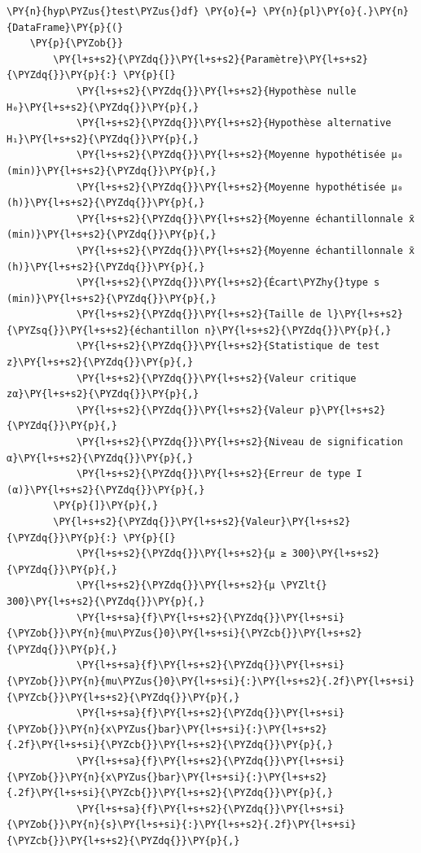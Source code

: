 \begin{tcolorbox}[breakable, size=fbox, boxrule=1pt, pad at break*=1mm,colback=cellbackground, colframe=cellborder]
\begin{Verbatim}[commandchars=\\\{\}]
\PY{n}{hyp\PYZus{}test\PYZus{}df} \PY{o}{=} \PY{n}{pl}\PY{o}{.}\PY{n}{DataFrame}\PY{p}{(}
    \PY{p}{\PYZob{}}
        \PY{l+s+s2}{\PYZdq{}}\PY{l+s+s2}{Paramètre}\PY{l+s+s2}{\PYZdq{}}\PY{p}{:} \PY{p}{[}
            \PY{l+s+s2}{\PYZdq{}}\PY{l+s+s2}{Hypothèse nulle H₀}\PY{l+s+s2}{\PYZdq{}}\PY{p}{,}
            \PY{l+s+s2}{\PYZdq{}}\PY{l+s+s2}{Hypothèse alternative H₁}\PY{l+s+s2}{\PYZdq{}}\PY{p}{,}
            \PY{l+s+s2}{\PYZdq{}}\PY{l+s+s2}{Moyenne hypothétisée μ₀ (min)}\PY{l+s+s2}{\PYZdq{}}\PY{p}{,}
            \PY{l+s+s2}{\PYZdq{}}\PY{l+s+s2}{Moyenne hypothétisée μ₀ (h)}\PY{l+s+s2}{\PYZdq{}}\PY{p}{,}
            \PY{l+s+s2}{\PYZdq{}}\PY{l+s+s2}{Moyenne échantillonnale x̄ (min)}\PY{l+s+s2}{\PYZdq{}}\PY{p}{,}
            \PY{l+s+s2}{\PYZdq{}}\PY{l+s+s2}{Moyenne échantillonnale x̄ (h)}\PY{l+s+s2}{\PYZdq{}}\PY{p}{,}
            \PY{l+s+s2}{\PYZdq{}}\PY{l+s+s2}{Écart\PYZhy{}type s (min)}\PY{l+s+s2}{\PYZdq{}}\PY{p}{,}
            \PY{l+s+s2}{\PYZdq{}}\PY{l+s+s2}{Taille de l}\PY{l+s+s2}{\PYZsq{}}\PY{l+s+s2}{échantillon n}\PY{l+s+s2}{\PYZdq{}}\PY{p}{,}
            \PY{l+s+s2}{\PYZdq{}}\PY{l+s+s2}{Statistique de test z}\PY{l+s+s2}{\PYZdq{}}\PY{p}{,}
            \PY{l+s+s2}{\PYZdq{}}\PY{l+s+s2}{Valeur critique zα}\PY{l+s+s2}{\PYZdq{}}\PY{p}{,}
            \PY{l+s+s2}{\PYZdq{}}\PY{l+s+s2}{Valeur p}\PY{l+s+s2}{\PYZdq{}}\PY{p}{,}
            \PY{l+s+s2}{\PYZdq{}}\PY{l+s+s2}{Niveau de signification α}\PY{l+s+s2}{\PYZdq{}}\PY{p}{,}
            \PY{l+s+s2}{\PYZdq{}}\PY{l+s+s2}{Erreur de type I (α)}\PY{l+s+s2}{\PYZdq{}}\PY{p}{,}
        \PY{p}{]}\PY{p}{,}
        \PY{l+s+s2}{\PYZdq{}}\PY{l+s+s2}{Valeur}\PY{l+s+s2}{\PYZdq{}}\PY{p}{:} \PY{p}{[}
            \PY{l+s+s2}{\PYZdq{}}\PY{l+s+s2}{μ ≥ 300}\PY{l+s+s2}{\PYZdq{}}\PY{p}{,}
            \PY{l+s+s2}{\PYZdq{}}\PY{l+s+s2}{μ \PYZlt{} 300}\PY{l+s+s2}{\PYZdq{}}\PY{p}{,}
            \PY{l+s+sa}{f}\PY{l+s+s2}{\PYZdq{}}\PY{l+s+si}{\PYZob{}}\PY{n}{mu\PYZus{}0}\PY{l+s+si}{\PYZcb{}}\PY{l+s+s2}{\PYZdq{}}\PY{p}{,}
            \PY{l+s+sa}{f}\PY{l+s+s2}{\PYZdq{}}\PY{l+s+si}{\PYZob{}}\PY{n}{mu\PYZus{}0}\PY{l+s+si}{:}\PY{l+s+s2}{.2f}\PY{l+s+si}{\PYZcb{}}\PY{l+s+s2}{\PYZdq{}}\PY{p}{,}
            \PY{l+s+sa}{f}\PY{l+s+s2}{\PYZdq{}}\PY{l+s+si}{\PYZob{}}\PY{n}{x\PYZus{}bar}\PY{l+s+si}{:}\PY{l+s+s2}{.2f}\PY{l+s+si}{\PYZcb{}}\PY{l+s+s2}{\PYZdq{}}\PY{p}{,}
            \PY{l+s+sa}{f}\PY{l+s+s2}{\PYZdq{}}\PY{l+s+si}{\PYZob{}}\PY{n}{x\PYZus{}bar}\PY{l+s+si}{:}\PY{l+s+s2}{.2f}\PY{l+s+si}{\PYZcb{}}\PY{l+s+s2}{\PYZdq{}}\PY{p}{,}
            \PY{l+s+sa}{f}\PY{l+s+s2}{\PYZdq{}}\PY{l+s+si}{\PYZob{}}\PY{n}{s}\PY{l+s+si}{:}\PY{l+s+s2}{.2f}\PY{l+s+si}{\PYZcb{}}\PY{l+s+s2}{\PYZdq{}}\PY{p}{,}

\end{Verbatim}
\end{tcolorbox}
